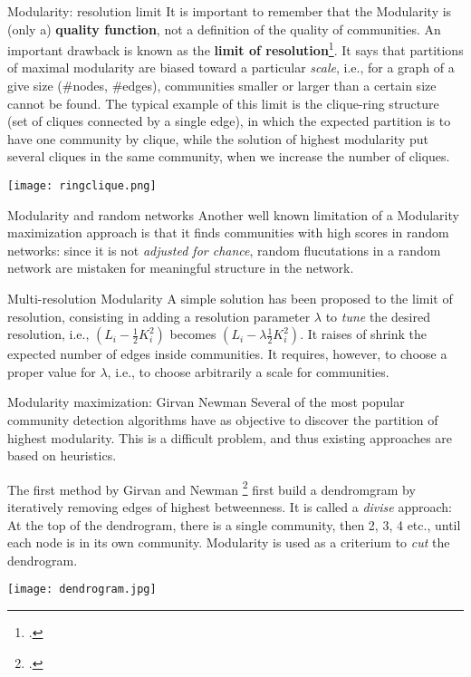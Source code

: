 \begin{textbox}{Modularity: resolution limit}
It is important to remember that the Modularity is (only a) \textbf{quality function}, not a definition of the quality of communities. An important drawback is known as the \textbf{limit of resolution}\footcite{fortunato2007resolution}. It says that partitions of maximal modularity are biased toward a particular \textit{scale}, i.e., for a graph of a give size (\#nodes, \#edges), communities smaller or larger than a certain size cannot be found. The typical example of this limit is the clique-ring structure (set of cliques connected by a single edge), in which the expected partition is to have one community by clique, while the solution of highest modularity put several cliques in the same community, when we increase the number of cliques.

\texttt{[image: ringclique.png]}
\end{textbox}

\begin{textbox}{Modularity and random networks}
Another well known limitation of a Modularity maximization approach is that it finds communities with high scores in random networks: since it is not \textit{adjusted for chance}, random flucutations in a random network are mistaken for meaningful structure in the network.
\end{textbox}

\begin{textbox}{Multi-resolution Modularity}
A simple solution has been proposed to the limit of resolution, consisting in adding a resolution parameter $\lambda$ to \textit{tune} the desired resolution\cite{reichardt2006statistical}, i.e., $(L_{i}-\frac{1}{2}K_i^2)$ becomes $(L_{i}-\lambda \frac{1}{2}K_i^2)$. It raises of shrink the expected number of edges inside communities. It requires, however, to choose a proper value for $\lambda$, i.e., to choose arbitrarily a scale for communities.
\end{textbox}

\begin{textbox}{Modularity maximization: Girvan Newman}
Several of the most popular community detection algorithms have as objective to discover the partition of highest modularity. This is a difficult problem, and thus existing approaches are based on heuristics. 

The first method by Girvan and Newman \footcite{girvan2002community} first build a dendromgram by iteratively removing edges of highest betweenness. It is called a \textit{divise} approach: At the top of the dendrogram, there is a single community, then 2, 3, 4 etc., until each node is in its own community. Modularity is used as a criterium to \textit{cut} the dendrogram. 

\centering
\texttt{[image: dendrogram.jpg]}

\end{textbox}

